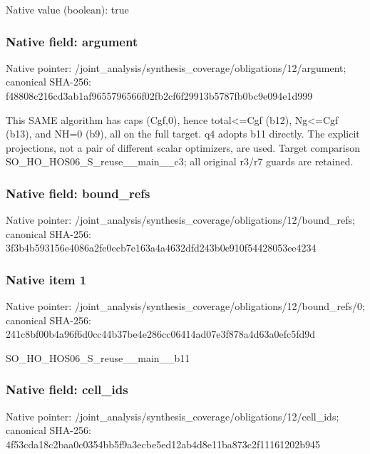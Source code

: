 \documentclass[10pt,a4paper]{article}
\begin{document}
Native value (boolean): true

\subsubsection{Native field: argument}
Native pointer: /joint\_\allowbreak{}analysis/synthesis\_\allowbreak{}coverage/obligations/12/argument; canonical SHA-256: f48808c216cd3ab1af9655796566f02fb2cf6f29913b5787fb0bc9e094e1d999

\begingroup\raggedright\sloppy This SAME algorithm has caps (Cgf,\allowbreak{}0),\allowbreak{} hence total<=\allowbreak{}Cgf (b12),\allowbreak{} Ng<=\allowbreak{}Cgf (b13),\allowbreak{} and NH=\allowbreak{}0 (b9),\allowbreak{} all on the full target. q4 adopts b11 directly. The explicit projections,\allowbreak{} not a pair of different scalar optimizers,\allowbreak{} are used. Target comparison SO\_\allowbreak{}HO\_\allowbreak{}HOS06\_\allowbreak{}S\_\allowbreak{}reuse\_\allowbreak{}\_\allowbreak{}main\_\allowbreak{}\_\allowbreak{}c3;\allowbreak{} all original r3/\allowbreak{}r7 guards are retained.\par\endgroup

\subsubsection{Native field: bound\_\allowbreak{}refs}
Native pointer: /joint\_\allowbreak{}analysis/synthesis\_\allowbreak{}coverage/obligations/12/bound\_\allowbreak{}refs; canonical SHA-256: 3f3b4b593156e4086a2fe0ecb7e163a4a4632dfd243b0e910f54428053ee4234

\subsubsection{Native item 1}
Native pointer: /joint\_\allowbreak{}analysis/synthesis\_\allowbreak{}coverage/obligations/12/bound\_\allowbreak{}refs/0; canonical SHA-256: 241c8bf00b4a96f6d0cc44b37be4e286cc06414ad07e3f878a4d63a0efc5fd9d

\begingroup\raggedright\sloppy SO\_\allowbreak{}HO\_\allowbreak{}HOS06\_\allowbreak{}S\_\allowbreak{}reuse\_\allowbreak{}\_\allowbreak{}main\_\allowbreak{}\_\allowbreak{}b11\par\endgroup

\subsubsection{Native field: cell\_\allowbreak{}ids}
Native pointer: /joint\_\allowbreak{}analysis/synthesis\_\allowbreak{}coverage/obligations/12/cell\_\allowbreak{}ids; canonical SHA-256: 4f53cda18c2baa0c0354bb5f9a3ecbe5ed12ab4d8e11ba873c2f11161202b945
\end{document}
